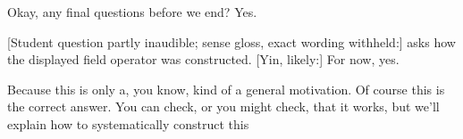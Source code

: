 Okay, any final questions before we end? Yes.


[Student question partly inaudible; sense gloss, exact wording withheld:] asks how the displayed field operator was constructed. [Yin, likely:] For now, yes.


Because this is only a, you know, kind of a general motivation. Of course this is the correct answer. You can check, or you might check, that it works, but we'll explain how to systematically construct this

